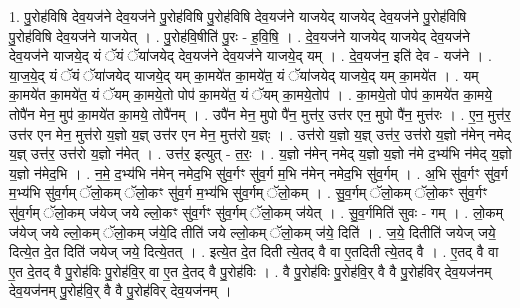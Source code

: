 \documentclass[17pt]{extarticle}
\begin{document}
1. पु॒रोह॑विषि देव॒यज॑ने देव॒यज॑ने पु॒रोह॑विषि पु॒रोह॑विषि देव॒यज॑ने याजयेद् याजयेद् देव॒यज॑ने पु॒रोह॑विषि पु॒रोह॑विषि देव॒यज॑ने याजयेत् । . पु॒रोह॑वि॒षीति॑ पु॒रः - ह॒वि॒षि॒ । . दे॒व॒यज॑ने याजयेद् याजयेद् देव॒यज॑ने देव॒यज॑ने याजये॒द् यं ॅयं ॅया॑जयेद् देव॒यज॑ने देव॒यज॑ने याजये॒द् यम् । . दे॒व॒यज॑न॒ इति॑ देव - यज॑ने । . या॒ज॒ये॒द् यं ॅयं ॅया॑जयेद् याजये॒द् यम् का॒मये॑त का॒मये॑त॒ यं ॅया॑जयेद् याजये॒द् यम् का॒मये॑त । . यम् का॒मये॑त का॒मये॑त॒ यं ॅयम् का॒मये॒तो पोप॑ का॒मये॑त॒ यं ॅयम् का॒मये॒तोप॑ । . का॒मये॒तो पोप॑ का॒मये॑त का॒मये॒ तोपै॑न मेन॒ मुप॑ का॒मये॑त का॒मये॒ तोपै॑नम् । . उपै॑न मेन॒ मुपो पै॑न॒ मुत्त॑र॒ उत्त॑र एन॒ मुपो पै॑न॒ मुत्त॑रः । . ए॒न॒ मुत्त॑र॒ उत्त॑र एन मेन॒ मुत्त॑रो य॒ज्ञो य॒ज्ञ् उत्त॑र एन मेन॒ मुत्त॑रो य॒ज्ञ्ः । . उत्त॑रो य॒ज्ञो य॒ज्ञ् उत्त॑र॒ उत्त॑रो य॒ज्ञो न॑मेन् नमेद् य॒ज्ञ् उत्त॑र॒ उत्त॑रो य॒ज्ञो न॑मेत् । . उत्त॑र॒ इत्युत् - त॒रः॒ । . य॒ज्ञो न॑मेन् नमेद् य॒ज्ञो य॒ज्ञो न॑मे द॒भ्य॑भि न॑मेद् य॒ज्ञो य॒ज्ञो न॑मेद॒भि । . न॒मे॒ द॒भ्य॑भि न॑मेन् नमेद॒भि सु॑व॒र्गꣳ सु॑व॒र्ग म॒भि न॑मेन् नमेद॒भि सु॑व॒र्गम् । . अ॒भि सु॑व॒र्गꣳ सु॑व॒र्ग म॒भ्य॑भि सु॑व॒र्गम् ॅलो॒कम् ॅलो॒कꣳ सु॑व॒र्ग म॒भ्य॑भि सु॑व॒र्गम् ॅलो॒कम् । . सु॒व॒र्गम् ॅलो॒कम् ॅलो॒कꣳ सु॑व॒र्गꣳ सु॑व॒र्गम् ॅलो॒कम् ज॑येज् जये ल्लो॒कꣳ सु॑व॒र्गꣳ सु॑व॒र्गम् ॅलो॒कम् ज॑येत् । . सु॒व॒र्गमिति॑ सुवः - गम् । . लो॒कम् ज॑येज् जये ल्लो॒कम् ॅलो॒कम् ज॑ये॒दि तीति॑ जये ल्लो॒कम् ॅलो॒कम् ज॑ये॒ दिति॑ । . ज॒ये॒ दितीति॑ जयेज् जये॒ दित्ये॒त दे॒त दिति॑ जयेज् जये॒ दित्ये॒तत् । . इत्ये॒त दे॒त दिती त्ये॒तद् वै वा ए॒तदिती त्ये॒तद् वै । . ए॒तद् वै वा ए॒त दे॒तद् वै पु॒रोह॑विः पु॒रोह॑वि॒र् वा ए॒त दे॒तद् वै पु॒रोह॑विः । . वै पु॒रोह॑विः पु॒रोह॑वि॒र् वै वै पु॒रोह॑विर् देव॒यज॑नम् देव॒यज॑नम् पु॒रोह॑वि॒र् वै वै पु॒रोह॑विर् देव॒यज॑नम् । \newline
\end{document}
